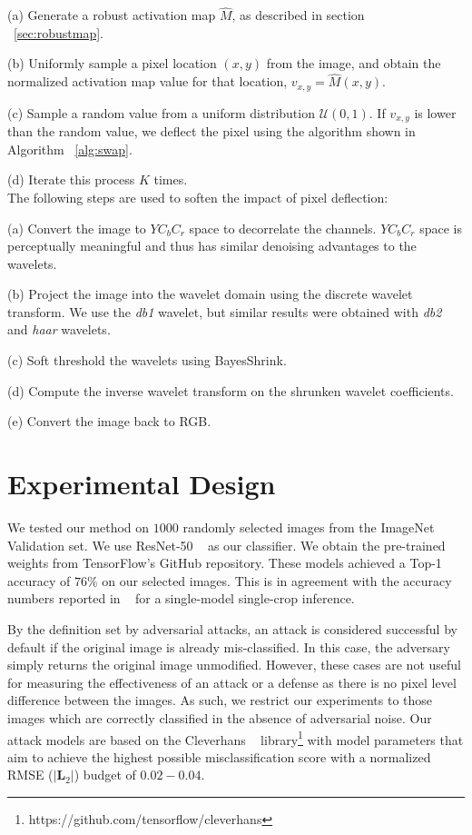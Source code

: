 (a) Generate a robust activation map $\widehat{M}$, as described in section ~\ref{sec:robustmap}.

(b) Uniformly sample a pixel location $(x,y)$ from the image, and obtain the normalized activation map value for that location, $v_{x,y} = \widehat{M}(x,y)$.

(c) Sample a random value from a uniform distribution $\mathcal{U}(0,1)$. If $v_{x,y}$ is lower than the random value, we deflect the pixel using the algorithm shown in Algorithm  ~\ref{alg:swap}. 

(d) Iterate this process $K$ times. \\

The following steps are used to soften the impact of pixel deflection:

(a) Convert the image to $YC_bC_r$ space to decorrelate the channels. $YC_bC_r$ space is perceptually meaningful and thus has similar denoising advantages to the wavelets.  

(b) Project the image into the wavelet domain using the discrete wavelet transform. We use the \textit{db1} wavelet, but similar results were obtained with \textit{db2} and \textit{haar} wavelets. 

(c) Soft threshold the wavelets using BayesShrink. 

(d) Compute the inverse wavelet transform on the shrunken wavelet coefficients.

(e) Convert the image back to RGB.

\section{Experimental Design\label{sec:exp}}

We tested our method on $1000$ randomly selected images from the ImageNet ~\cite{Deng2009ImageNetAL} Validation set. 
We use ResNet-50 ~\cite{he2015deep} as our classifier. 
We obtain the pre-trained weights from TensorFlow's GitHub repository.
These models achieved a Top-1 accuracy of $76\%$ on our selected images. %
This is in agreement with the accuracy numbers reported in ~\cite{he2015deep} for a single-model single-crop inference.

By the definition set by adversarial attacks, an attack is considered successful by default if the original image is already mis-classified. 
In this case, the adversary simply returns the original image unmodified. 
However, these cases are not useful for measuring the effectiveness of an attack or a defense as there is no pixel level difference between the images.
As such, we restrict our experiments to those images which are correctly classified in the absence of adversarial noise.
Our attack models are based on the Cleverhans  ~\cite{papernot2017cleverhans} library\footnote{https://github.com/tensorflow/cleverhans} with model parameters that aim to achieve the highest possible misclassification score with a normalized RMSE ($|\bm{L}_2|$) budget of $0.02-0.04$.

